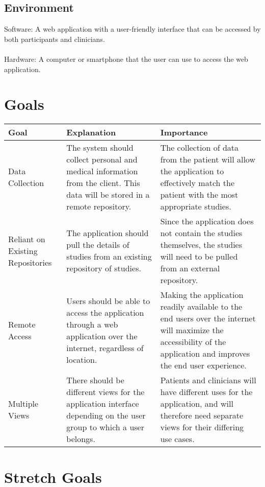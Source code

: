 \documentclass{article}
\begin{document}
\subsection{Environment}
Software: A web application with a user-friendly interface that can be accessed by both participants and clinicians.\\
\\
Hardware: A computer or smartphone that the user can use to access the web application.


\section{Goals}

\begin{table}[H]
\centering
\begin{tabular}{| p{3cm} | p{5cm} | p{5cm} |}
\hline
Goal & Explanation & Importance \\
\hline  \hline
Data Collection & The system should collect personal and medical information from the client. This data will be stored in a remote repository. & The collection of data from the patient will allow the application to effectively match the patient with the most appropriate studies. \\
\hline
Reliant on Existing Repositories & The application should pull the details of studies from an existing repository of studies. & Since the application does not contain the studies themselves, the studies will need to be pulled from an external repository. \\
\hline
Remote Access & Users should be able to access the application through a web application over the internet, regardless of location. & Making the application readily available to the end users over the internet will maximize the accessibility of the application and improves the end user experience. \\
\hline
Multiple Views & There should be different views for the application interface depending on the user group to which a user belongs. & Patients and clinicians will have different uses for the application, and will therefore need separate views for their differing use cases. \\
\hline

\end{tabular}
\end{table}

\section{Stretch Goals}
\end{document}
